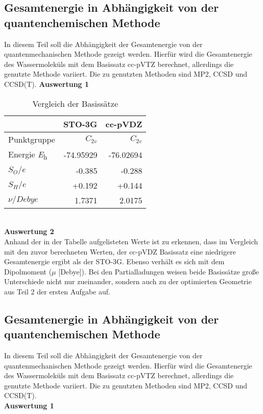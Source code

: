 \documentclass[12pt]{article}
\begin{document}
\begin{onehalfspace}
\subsection{Gesamtenergie in Abhängigkeit von der quantenchemischen Methode}
In diesem Teil soll die Abhängigkeit der Gesamtenergie von der quantenmechanischen Methode gezeigt werden. Hierfür wird die Gesamtenergie des Wassermoleküls mit dem Basissatz cc-pVTZ berechnet, allerdings die genutzte Methode variiert. Die zu genutzten Methoden sind MP2, CCSD und CCSD(T).
\newpage
\noindent
\textbf{Auswertung 1}\\
\begin{table}[!htpb]
\centering
\caption{Vergleich der Basissätze}
\begin{tabular}{lrr}
\toprule
 &
STO-3G &
cc-pVDZ \\
\midrule
Punktgruppe & $C _{2v}$ & $C _{2v}$\\
Energie \si{\hartree}    & -74.95929 & -76.02694  \\
$S _O / \textit{e}$ & -0.385 & -0.288  \\
$S _H / \textit{e}$ & +0.192 & +0.144  \\
$\nu / \textit{Debye}$ & 1.7371 & 2.0175  \\
\bottomrule
\end{tabular}
\end{table}\\
\textbf{Auswertung 2}\\
Anhand der in der Tabelle aufgelisteten Werte ist zu erkennen, dass im Vergleich mit den zuvor berechneten Werten, der cc-pVDZ Basissatz eine niedrigere Gesamtenergie ergibt als der STO-3G. Ebenso verhält es sich mit dem Dipolmoment ($\mu$ [Debye]). Bei den Partialladungen weisen beide Basissätze große Unterschiede nicht nur zueinander, sondern auch zu der optimierten Geometrie aus Teil 2 der ersten Aufgabe auf. 
\subsection{Gesamtenergie in Abhängigkeit von der quantenchemischen Methode}
In diesem Teil soll die Abhängigkeit der Gesamtenergie von der quantenmechanischen Methode gezeigt werden. Hierfür wird die Gesamtenergie des Wassermoleküls mit dem Basissatz cc-pVTZ berechnet, allerdings die genutzte Methode variiert. Die zu genutzten Methoden sind MP2, CCSD und CCSD(T).\\
\textbf{Auswertung 1}\\


\end{onehalfspace}
\end{document}
